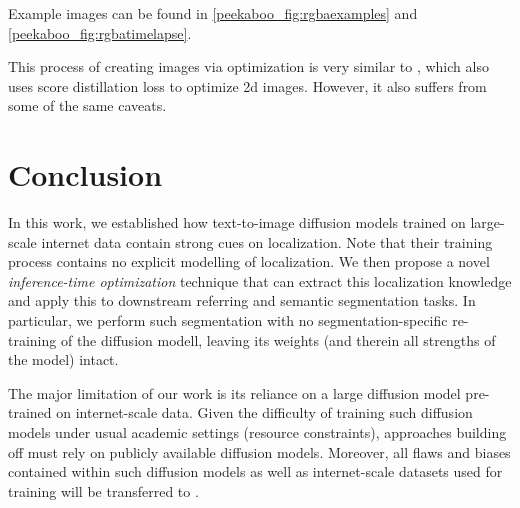 Example images can be found in \cref{peekaboo_fig:rgbaexamples} and \cref{peekaboo_fig:rgbatimelapse}.

This process of creating images via optimization is very similar to \cite{burgert2023diffusion_illusions}, which also uses score distillation loss to optimize 2d images. However, it also suffers from some of the same caveats.


\section{Conclusion}
\label{peekaboo_sec:conclusion}
In this work, we established how text-to-image diffusion models trained on large-scale internet data contain strong cues on localization. Note that their training process contains no explicit modelling of localization. We then propose a novel \textit{inference-time optimization} technique that can extract this localization knowledge and apply this to downstream referring and semantic segmentation tasks. In particular, we perform such segmentation with no segmentation-specific re-training of the diffusion modell, leaving its weights (and therein all strengths of the model) intact.

The major limitation of our work is its reliance on a large diffusion model pre-trained on internet-scale data. Given the difficulty of training such diffusion models under usual academic settings (resource constraints), approaches building off \modelname must rely on publicly available diffusion models. Moreover, all flaws and biases contained within such diffusion models \cite{sueing_sd} as well as internet-scale datasets used for training \cite{birhane2021multimodal} will be transferred to \modelname. 


